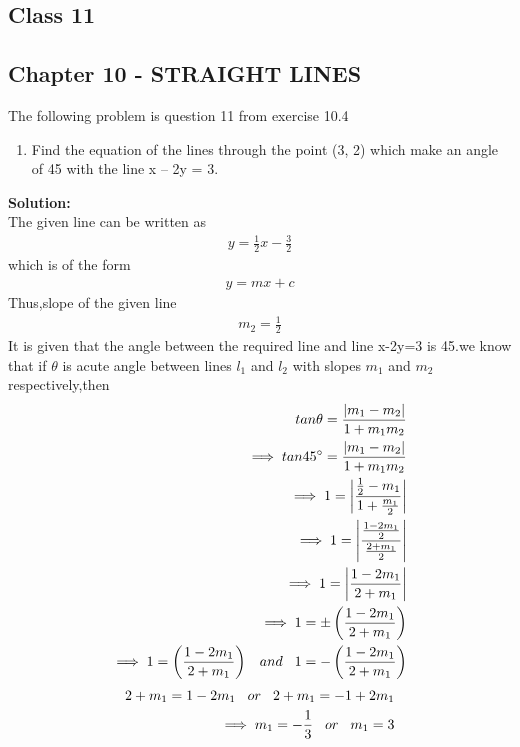 \documentclass{article}
\begin{document}
\onehalfspacing
\begin{center}
	\section*{\textbf{Class 11}}
	\subsection*{Chapter 10 - STRAIGHT LINES}
\end{center}
The following problem is question 11 from exercise 10.4
\begin{enumerate}
    \item Find the equation of the lines through the point (3, 2) which make an angle of 45\textdegree \hspace{0.1cm} with the line x – 2y = 3.
\end{enumerate}
\textbf{Solution:}\\
The given line can be written as 
\begin{align}
    y=\frac{1}{2}x-\frac{3}{2}
\end{align}
which is of the form
\begin{align}
    y=mx+c
\end{align}
Thus,slope of the given line \begin{align}
    m_2=\frac{1}{2}
\end{align}
It is given that the angle between the required line and line x-2y=3 is 45\textdegree.we know that if $\theta$ is acute angle between lines $l_1$ and $l_2$ with slopes $m_1$ and $m_2$ respectively,then
\begin{align}
tan\theta=\frac{|{m_1-m_2}|}{1+m_1m_2}\\
\implies tan45^\circ=\frac{|{m_1-m_2}|}{1+m_1m_2}\\
\implies 1=\left | \frac{\frac{1}{2}-m_1}{1+\frac{m_1}{2}} \right|\\
\implies 1=\left |\frac{\frac{1-2m_1}{2}}{\frac{2+m_1}{2}} \right|\\
\implies 1=\left|\frac{1-2m_1}{2+m_1}\right|\\
\implies 1=\pm \left(\frac{1-2m_1}{2+m_1}\right)\\
\implies 1=\left(\frac{1-2m_1}{2+m_1}\right)\hspace{0.3cm} and\hspace{0.3cm}  1=- \left(\frac{1-2m_1}{2+m_1}\right)
\end{align}
\begin{align}
    2+m_1=1-2m_1 \hspace{0.3cm} or \hspace{0.3cm} 2+m_1=-1+2m_1\\
    \implies m_1=-\frac{1}{3} \hspace{0.3cm}or\hspace{0.3cm}m_1=3
\end{align}
\end{document}
